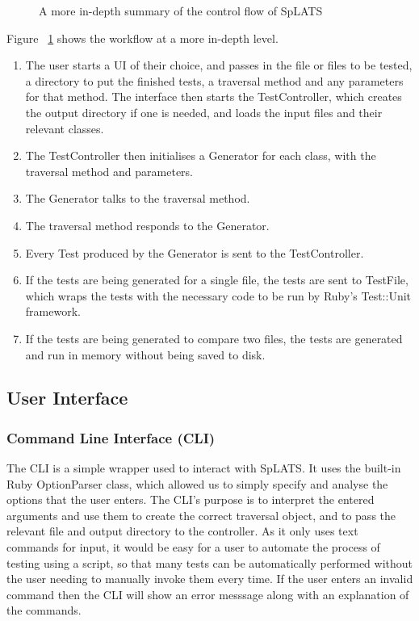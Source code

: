   \begin{center}
  \begin{figure}
  
  \caption{A more in-depth summary of the control flow of SpLATS}
  \label{fig:Architecture_LowLevel}
  \end{figure}
  \end{center}
  Figure ~\ref{fig:Architecture_LowLevel} shows the workflow at a more in-depth level.
  \begin{enumerate}
  \small
  \item The user starts a UI of their choice, and passes in the file or files to be tested, a directory to put the finished tests, a traversal method and any parameters for that method.
    The interface then starts the TestController, which creates the output directory if one is needed, and loads the input files and their relevant classes.
  \item The TestController then initialises a Generator for each class, with the traversal method and parameters.
  \item The Generator talks to the traversal method.
  \item The traversal method responds to the Generator.
  \item Every Test produced by the Generator is sent to the TestController.
  \item If the tests are being generated for a single file, the tests are sent to TestFile, which wraps the tests with the necessary code to be run by Ruby's Test::Unit framework. 
  \item If the tests are being generated to compare two files, the tests are generated and run in memory without being saved to disk.
  \end{enumerate}
  
  \subsection{User Interface}
  \setcounter{secnumdepth}{4}
  \subsubsection{Command Line Interface (CLI)}
  
  The CLI is a simple wrapper used to interact with SpLATS. 
  It uses the built-in Ruby OptionParser class, which allowed us to simply specify and analyse the options that the user enters. 
  The CLI's purpose is to interpret the entered arguments and use them to create the correct traversal object, and to pass the relevant file and output directory to the controller.
  As it only uses text commands for input, it would be easy for a user to automate the process of testing using a script, so that many tests can be automatically performed without the user needing to manually invoke them every time.
  If the user enters an invalid command then the CLI will show an error messsage along with an explanation of the commands.
  
